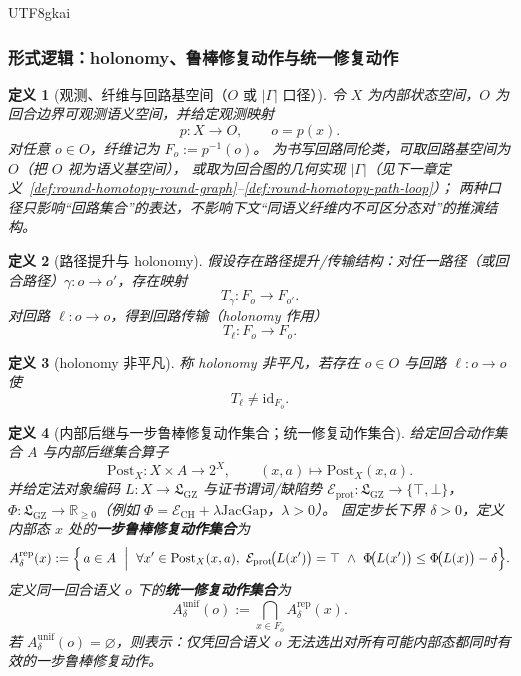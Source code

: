 \documentclass[12pt]{article}
\newtheorem{definition}{定义}[section]
\newcommand{\RR}{\mathbb{R}}
\newcommand{\GZLS}{\ensuremath{\mathfrak{L}_{\mathrm{GZ}}}}
\newcommand{\JacGap}{\ensuremath{\mathrm{JacGap}}} %
\begin{document}
\begin{CJK*}{UTF8}{gkai}
\subsubsection{形式逻辑：holonomy、鲁棒修复动作与统一修复动作}
\label{sec:lag-holonomy-defs}

\begin{definition}[观测、纤维与回路基空间（$O$ 或 $|\Gamma|$ 口径）]
\label{def:lag-holonomy-fiber-loop}
令 $X$ 为内部状态空间，$O$ 为回合边界可观测语义空间，并给定观测映射
\[
  p:X\to O,\qquad o=p(x).
\]
对任意 $o\in O$，纤维记为 $F_o:=p^{-1}(o)$。
为书写回路同伦类，可取回路基空间为 $O$（把 $O$ 视为语义基空间），
或取为回合图的几何实现 $|\Gamma|$（见下一章定义~\ref{def:round-homotopy-round-graph}--\ref{def:round-homotopy-path-loop}）；
两种口径只影响“回路集合”的表达，不影响下文“同语义纤维内不可区分态对”的推演结构。
\end{definition}

\begin{definition}[路径提升与 holonomy]
\label{def:lag-holonomy-transport}
假设存在路径提升/传输结构：对任一路径（或回合路径）$\gamma:o\to o'$，存在映射
\[
  T_{\gamma}:F_o\to F_{o'}.
\]
对回路 $\ell:o\to o$，得到回路传输（holonomy 作用）
\[
  T_{\ell}:F_o\to F_o.
\]
\end{definition}

\begin{definition}[holonomy 非平凡]
\label{def:lag-nontrivial-holonomy}
称 holonomy 非平凡，若存在 $o\in O$ 与回路 $\ell:o\to o$ 使
\[
  T_{\ell}\neq \mathrm{id}_{F_o}.
\]
\end{definition}

\begin{definition}[内部后继与一步鲁棒修复动作集合；统一修复动作集合]
\label{def:lag-uniform-repair-action}
给定回合动作集合 $A$ 与内部后继集合算子
\[
  \mathrm{Post}_{X}:X\times A\to 2^{X},\qquad (x,a)\mapsto \mathrm{Post}_{X}(x,a).
\]
并给定法对象编码 $L:X\to\GZLS$ 与证书谓词/缺陷势
$\mathcal{E}_{\mathrm{prot}}:\GZLS\to\{\top,\bot\}$，
$\Phi:\GZLS\to\RR_{\ge 0}$（例如 $\Phi=\mathcal{E}_{\mathrm{CH}}+\lambda\JacGap$，$\lambda>0$）。
固定步长下界 $\delta>0$，定义内部态 $x$ 处的\textbf{一步鲁棒修复动作集合}为
\[
  A^{\mathrm{rep}}_{\delta}(x)
  :=
  \Bigl\{\,a\in A\ \Bigm|\
  \forall x'\in\mathrm{Post}_{X}(x,a),\
  \mathcal{E}_{\mathrm{prot}}\!\bigl(L(x')\bigr)=\top\
  \wedge\
  \Phi\!\bigl(L(x')\bigr)\le \Phi\!\bigl(L(x)\bigr)-\delta
  \Bigr\}.
\]
定义同一回合语义 $o$ 下的\textbf{统一修复动作集合}为
\[
  A^{\mathrm{unif}}_{\delta}(o)
  :=
  \bigcap_{x\in F_o} A^{\mathrm{rep}}_{\delta}(x).
\]
若 $A^{\mathrm{unif}}_{\delta}(o)=\varnothing$，则表示：仅凭回合语义 $o$ 无法选出对所有可能内部态都同时有效的一步鲁棒修复动作。
\end{definition}


\end{CJK*}
\end{document}
